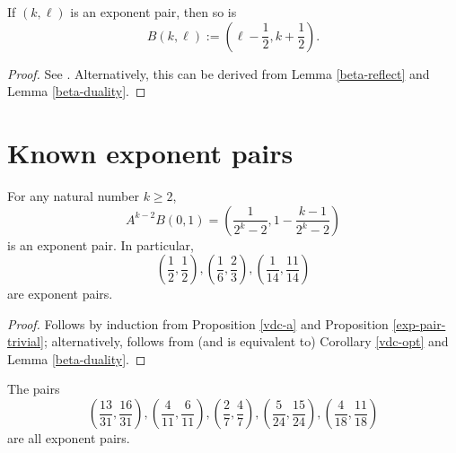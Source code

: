\begin{proposition}\label{vdc-b}
If $(k,\ell)$ is an exponent pair, then so is
    $$B(k,\ell) := \left(\ell-\frac{1}{2}, k+\frac{1}{2}\right).$$
\end{proposition}

\literature
{}

\begin{proof}  See \cite[Lemma 2.9]{ivic}.  Alternatively, this can be derived from Lemma \ref{beta-reflect} and Lemma \ref{beta-duality}.
\end{proof}


\section{Known exponent pairs}


\begin{proposition}\label{vdc-class} For any natural number $k \geq 2$,
    $$ A^{k-2} B(0,1) = \left( \frac{1}{2^k-2}, 1 - \frac{k-1}{2^k-2} \right)$$
    is an exponent pair.  In particular,
    $$ \left(\frac{1}{2}, \frac{1}{2}\right), \left(\frac{1}{6}, \frac{2}{3}\right), \left(\frac{1}{14}, \frac{11}{14}\right)$$
    are exponent pairs.
    \end{proposition}

    \begin{proof} Follows by induction from Proposition \ref{vdc-a} and Proposition \ref{exp-pair-trivial}; alternatively, follows from (and is equivalent to) Corollary \ref{vdc-opt} and Lemma \ref{beta-duality}.
    \end{proof}

\derived
{}

\begin{corollary}\label{add-exponential}  The pairs
$$ \left(\frac{13}{31}, \frac{16}{31}\right), \left(\frac{4}{11},\frac{6}{11}\right), \left(\frac{2}{7},\frac{4}{7}\right), \left(\frac{5}{24},\frac{15}{24}\right), \left(\frac{4}{18},\frac{11}{18}\right)$$
are all exponent pairs.
\end{corollary}

\derived
{}

